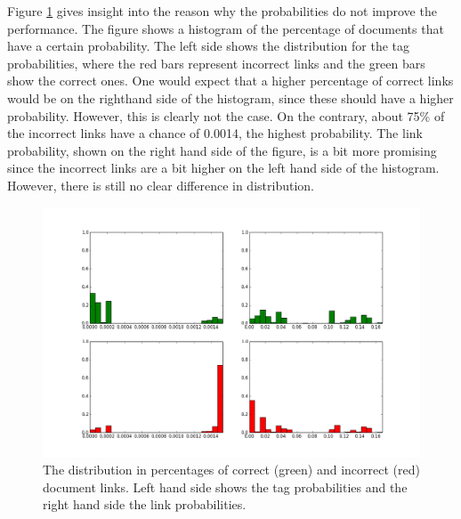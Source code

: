Figure \ref{distribution} gives insight into the reason why the probabilities
do not improve the performance. The figure shows a histogram of the percentage
of documents that have a certain probability. The left side shows the
distribution for the tag probabilities, where the red bars represent incorrect
links and the green bars show the correct ones. One would expect that a higher
percentage of correct links would be on the righthand side of the histogram,
since these should have a higher probability. However, this is clearly not the
case. On the contrary, about 75\% of the incorrect links have a chance of
0.0014, the highest probability. The link probability, shown on the right hand
side of the figure, is a bit more promising since the incorrect links are a bit
higher on the left hand side of the histogram. However, there is still no clear
difference in distribution. 

\begin{figure}
\includegraphics[width =\textwidth]{images/probabilities}
\caption{The distribution in percentages of correct (green) and incorrect (red) document links. Left hand side shows the tag probabilities and the right hand side the link probabilities.}
\label{distribution}
\end{figure}


